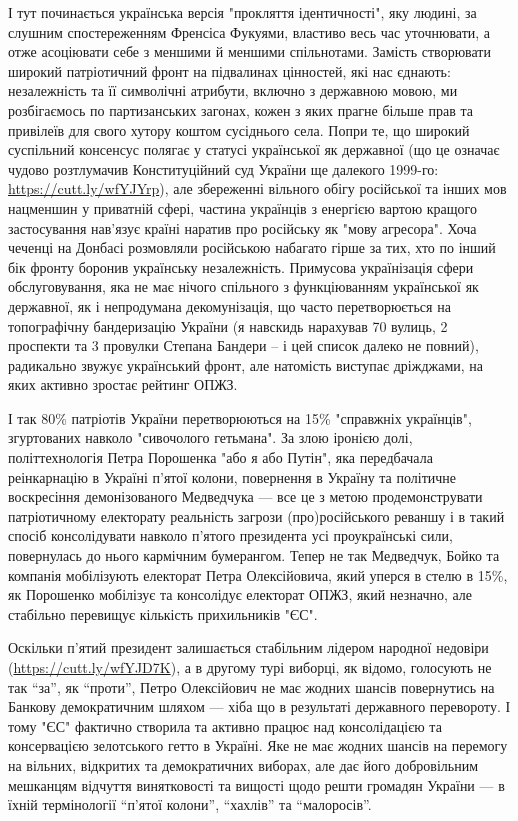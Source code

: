 \begin{itemize}
\begin{multicols}{2}
І тут починається українська версія "прокляття ідентичності", яку людині, за
слушним спостереженням Френсіса Фукуями, властиво весь час уточнювати, а отже
асоціювати себе з меншими й меншими спільнотами. Замість створювати широкий
патріотичний фронт на підвалинах цінностей, які нас єднають: незалежність та її
символічні атрибути, включно з державною мовою, ми розбігаємось по
партизанських загонах, кожен з яких прагне більше прав та привілеїв для свого
хутору коштом сусіднього села. Попри те, що широкий суспільний консенсус
полягає у статусі української як державної (що це означає чудово розтлумачив
Конституційний суд України ще далекого 1999-го: \url{https://cutt.ly/wfYJYrp}), але
збереженні вільного обігу російської та інших мов нацменшин у приватній сфері,
частина українців з енергією вартою кращого застосування нав’язує країні
наратив про російську як "мову агресора". Хоча чеченці на Донбасі розмовляли
російською набагато гірше за тих, хто по інший бік фронту боронив українську
незалежність. Примусова українізація сфери обслуговування, яка не має нічого
спільного з функціюванням української як державної, як і непродумана
декомунізація, що часто перетворюється на топографічну бандеризацію України (я
навскидь нарахував 70 вулиць, 2 проспекти та 3 провулки Степана Бандери – і цей
список далеко не повний), радикально звужує український фронт, але натомість
виступає дріжджами, на яких активно зростає рейтинг ОПЖЗ.

І так 80\% патріотів України перетворюються на 15\% "справжніх українців",
згуртованих навколо "сивочолого гетьмана". За злою іронією долі,
політтехнологія Петра Порошенка "або я або Путін", яка передбачала реінкарнацію
в Україні п’ятої колони, повернення в Україну та політичне воскресіння
демонізованого Медведчука — все це з метою продемонструвати патріотичному
електорату реальність загрози (про)російського реваншу і в такий спосіб
консолідувати навколо п’ятого президента усі проукраїнські сили, повернулась до
нього кармічним бумерангом. Тепер не так Медведчук, Бойко та компанія
мобілізують електорат Петра Олексійовича, який уперся в стелю в 15\%, як
Порошенко мобілізує та консолідує електорат ОПЖЗ, який незначно, але стабільно
перевищує кількість прихильників "ЄС".

Оскільки п’ятий президент залишається стабільним лідером народної недовіри
(\url{https://cutt.ly/wfYJD7K}), а в другому турі виборці, як відомо, голосують не
так \enquote{за}, як \enquote{проти}, Петро Олексійович не має жодних шансів повернутись на
Банкову демократичним шляхом — хіба що в результаті державного перевороту. І
тому "ЄС" фактично створила та активно працює над консолідацією та консервацією
зелотського гетто в Україні. Яке не має жодних шансів на перемогу на вільних,
відкритих та демократичних виборах, але дає його добровільним мешканцям
відчуття винятковості та вищості щодо решти громадян України — в їхній
термінології \enquote{п’ятої колони}, \enquote{хахлів} та \enquote{малоросів}.


\end{multicols}
\end{itemize}
